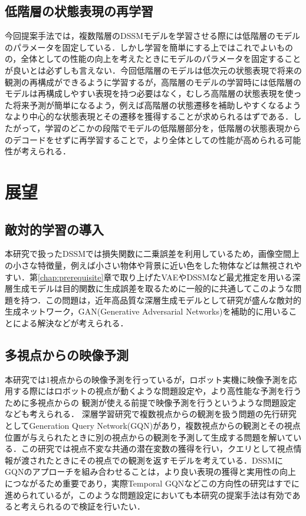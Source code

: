 \subsection{低階層の状態表現の再学習}
今回提案手法では，複数階層のDSSMモデルを学習させる際には低階層のモデルのパラメータを固定している．しかし学習を簡単にする上ではこれでよいものの，全体としての性能の向上を考えたときにモデルのパラメータを固定することが良いとは必ずしも言えない．今回低階層のモデルは低次元の状態表現で将来の観測の再構成ができるように学習するが，高階層のモデルの学習時には低階層のモデルは再構成しやすい表現を持つ必要はなく，むしろ高階層の状態表現を使った将来予測が簡単になるよう，例えば高階層の状態遷移を補助しやすくなるようなより中心的な状態表現とその遷移を獲得することが求められるはずである．したがって，学習のどこかの段階でモデルの低階層部分を，低階層の状態表現からのデコードをせずに再学習することで，より全体としての性能が高められる可能性が考えられる．

\section{展望}
\subsection{敵対的学習の導入}
本研究で扱ったDSSMでは損失関数に二乗誤差を利用しているため，画像空間上の小さな特徴量，例えば小さい物体や背景に近い色をした物体などは無視されやすい．第\ref{chap:prerequisite}章で取り上げたVAEやDSSMなど最尤推定を用いる深層生成モデルは目的関数に生成誤差を取るために一般的に共通してこのような問題を持つ．この問題は，近年高品質な深層生成モデルとして研究が盛んな敵対的生成ネットワーク，GAN(Generative Adversarial Networks)\cite{goodfellow2014generative}を補助的に用いることによる解決などが考えられる．

\subsection{多視点からの映像予測}
本研究では1視点からの映像予測を行っているが，ロボット実機に映像予測を応用する際にはロボットの視点が動くような問題設定や，より高性能な予測を行うために多視点からの
観測が使える前提で映像予測を行うというような問題設定なども考えられる．
深層学習研究で複数視点からの観測を扱う問題の先行研究としてGeneration Query Network(GQN)\cite{eslami2018neural}があり，複数視点からの観測とその視点位置が与えられたときに別の視点からの観測を予測して生成する問題を解いている．この研究では視点不変な共通の潜在変数の獲得を行い，クエリとして視点情報が渡されたときにその視点での観測を返すモデルを考えている．DSSMにGQNのアプローチを組み合わせることは，より良い表現の獲得と実用性の向上につながるため重要であり，実際Temporal GQN\cite{singh2019sequential}などこの方向性の研究はすでに進められているが，このような問題設定においても本研究の提案手法は有効であると考えられるので検証を行いたい．

